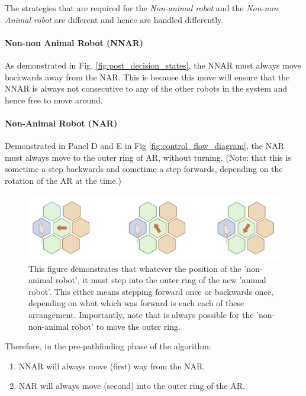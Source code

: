 The strategies that are required for the \textit{Non-animal robot} and the \textit{Non-non Animal robot} are different and hence are handled differently. 

\paragraph{Non-non Animal Robot (NNAR)}

As demonstrated in Fig. \ref{fig:post_decision_states}, the NNAR must always move backwards away from the NAR. This is because this move will ensure that the NNAR is always not consecutive to any of the other robots in the system and hence free to move around.

\paragraph{Non-Animal Robot (NAR)}

Demonstrated in Panel D and E in Fig \ref{fig:control_flow_diagram}, the NAR must always move to the outer ring of AR, without turning. (Note: that this is sometime a step backwards and sometime a step forwards, depending on the rotation of the AR at the time.)

\begin{figure}[h]
    \centering
    \includegraphics[scale = 0.5]{images/move_to_outer_ring.png}
    \caption{This figure demonstrates that whatever the position of the 'non-animal robot', it must step into the outer ring of the new 'animal robot'. This either means stepping forward once or backwards once, depending on what which was forward is each each of these arrangement. Importantly, note that is always possible for the 'non-non-animal robot' to move the outer ring.}
    \label{fig:nnar_move_to_outer_ring}
\end{figure}

\begin{tcolorbox}
Therefore, in the pre-pathfinding phase of the algorithm:
\begin{enumerate}
    \item NNAR will always move (first) way from the NAR.
    \item NAR will always move (second) into the outer ring of the AR.
\end{enumerate}
\end{tcolorbox}

